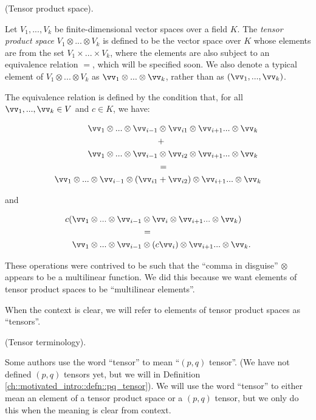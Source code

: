 \begin{defn}
\label{ch::motivated_intro::defn::tensor_product_space}
    (Tensor product space).
    
    Let $V_1, ..., V_k$ be finite-dimensional vector spaces over a field $K$. The \textit{tensor product space} $V_1 \otimes ... \otimes V_k$ is defined to be the vector space over $K$ whose elements are from the set $V_1 \times ... \times V_k$, where the elements are also subject to an equivalence relation $=$, which will be specified soon. We also denote a typical element of $V_1 \otimes ... \otimes V_k$ as $\vv_1 \otimes ... \otimes \vv_k$, rather than as $(\vv_1, ..., \vv_k)$. 
    
    The equivalence relation is defined by the condition that, for all $\vv_1, ..., \vv_k \in V$ and $c \in K$, we have:
    
    \begin{align*}
        \vv_1 \otimes ... \otimes \vv_{i - 1} &\otimes \vv_{i1} \otimes \vv_{i + 1} ... \otimes \vv_k \\
        &+ \\
        \vv_1 \otimes ... \otimes \vv_{i - 1} &\otimes \vv_{i2} \otimes \vv_{i + 1} ... \otimes \vv_k \\
        &= \\
        \vv_1 \otimes ... \otimes \vv_{i - 1} \otimes (\vv_{i1} &+ \vv_{i2}) \otimes \vv_{i + 1} ... \otimes \vv_k
    \end{align*}
    
    and
    
    \begin{align*}
        c (\vv_1 \otimes ... \otimes \vv_{i - 1} &\otimes \vv_i \otimes \vv_{i + 1} ... \otimes \vv_k ) \\
        &= \\
        \vv_1 \otimes ... \otimes \vv_{i - 1} &\otimes (c \vv_i) \otimes \vv_{i + 1} ... \otimes \vv_k.
    \end{align*}
    
    These operations were contrived to be such that the ``comma in disguise'' $\otimes$ appears to be a multilinear function. We did this because we want elements of tensor product spaces to be ``multilinear elements''.
    
    When the context is clear, we will refer to elements of tensor product spaces as ``tensors''.
\end{defn}

\begin{remark}
    (Tensor terminology). 
    
    Some authors use the word ``tensor'' to mean ``$(p, q)$ tensor''. (We have not defined $(p, q)$ tensors yet, but we will in Definition \ref{ch::motivated_intro::defn::pq_tensor}). We will use the word ``tensor'' to either mean an element of a tensor product space or a $(p, q)$ tensor, but we only do this when the meaning is clear from context.
\end{remark}

